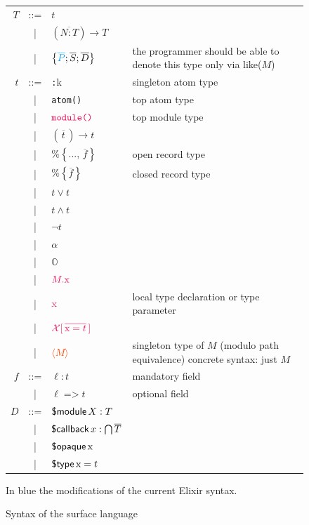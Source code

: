 \documentclass[a4paper,10pt]{article}
\begin{document}
\begin{figure}
\begin{tabular}{r c ll}
    $T$ & ::= & $t$ \\
    & | & $\left(\overline{N:T}\right)\rightarrow T$ \\
    & | & $\left\{\textcolor{Cerulean}{\overline{P}};\overline{S};\overline{D}\right\}$ & the programmer should be able to denote this type only via \textsf{like($M$)}\\
    $t$ & ::= & \texttt{:}k & singleton atom type\\
    & | & \texttt{atom()} & top atom type \\
    & | & $\texttt{\textcolor{OrangeRed}{module()}}$ & top module type \\
    & | & $(\overline{\,t\,})\rightarrow t$\\
    & | & $\texttt{\%}\!\left\{\texttt{..., }\overline{f}\right\}$ & open record type\\
    & | & $\texttt{\%}\!\left\{\overline{f}\right\}$ & closed record type \\
    & | & $t\vee t$ \\
    & | & $t\wedge t$ \\
    & | & $\neg t$\\
    & | & $\alpha$ \\
    & | & $\mathbb{O}$ \\
    & | & $\textcolor{OrangeRed}{M.\tx}$ \\
    & | & $\textcolor{OrangeRed}{\tx}$ & local type declaration or type parameter\\

    & | & $\textcolor{OrangeRed}{\BX[\,\overline{\tx=t}\,]}$ \\ %
    & | & \textcolor{OrangeRed}{$\langle M\rangle$} & singleton type of $M$ (modulo path equivalence) concrete syntax: just $M$
 \\
    $f$ & ::= & $\ell : t$ & mandatory field \\%
    & | & $\ell \;\texttt{=>}\; t$ & optional field\\ %
    $D$ & ::= & $\operatorname{\textsf{\$module}} X : T$ \\
    & | & $\operatorname{\textsf{\$callback}} x : \bigcap \overline{T}$ \\
    & | & $\operatorname{\textsf{\$opaque}} \text{\rm x}$ \\
    & | & $\operatorname{\textsf{\$type}} \text{\rm x} = t$\\
  \end{tabular}

  \bigskip
  In \textcolor{Cerulean}{blue} the modifications of the  current Elixir syntax.
  \caption{Syntax of the surface language }\label{fig:surfacesyntax}
\end{figure}
\end{document}
